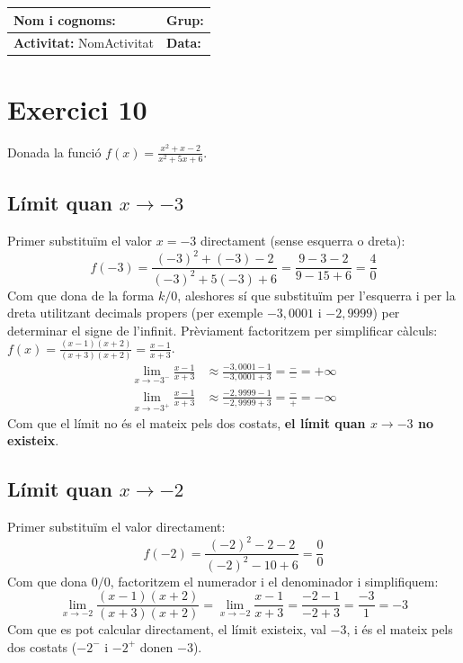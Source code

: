\documentclass[12pt,a4paper]{article}
\begin{document}
\begingroup
\renewcommand{\arraystretch}{2.2}
\begin{tabularx}{\textwidth}{|X|p{4cm}|}
    \hline
    \textbf{Nom i cognoms:} & \textbf{Grup:} \\ \hline
    \textbf{Activitat:} NomActivitat & \textbf{Data:} \\ \hline
\end{tabularx}
\endgroup

\vspace{0.8cm}

\section*{Exercici 10}
Donada la funció $f(x) = \frac{x^2+x-2}{x^2+5x+6}$.

\subsection*{Límit quan $x \to -3$}
Primer substituïm el valor $x = -3$ directament (sense esquerra o dreta):
\[ f(-3) = \frac{(-3)^2 + (-3) - 2}{(-3)^2 + 5(-3) + 6} = \frac{9 - 3 - 2}{9 - 15 + 6} = \frac{4}{0} \]
Com que dona de la forma $k/0$, aleshores sí que substituïm per l'esquerra i per la dreta utilitzant decimals propers (per exemple $-3,0001$ i $-2,9999$) per determinar el signe de l'infinit. Prèviament factoritzem per simplificar càlculs: $f(x) = \frac{(x-1)(x+2)}{(x+3)(x+2)} = \frac{x-1}{x+3}$.
\begin{align*}
    \lim_{x \to -3^-} \frac{x-1}{x+3} & \approx \frac{-3,0001 - 1}{-3,0001 + 3} = \frac{-}{-} = +\infty \\
    \lim_{x \to -3^+} \frac{x-1}{x+3} & \approx \frac{-2,9999 - 1}{-2,9999 + 3} = \frac{-}{+} = -\infty
\end{align*}
Com que el límit no és el mateix pels dos costats, \textbf{el límit quan $x \to -3$ no existeix}.

\subsection*{Límit quan $x \to -2$}
Primer substituïm el valor directament:
\[ f(-2) = \frac{(-2)^2 - 2 - 2}{(-2)^2 - 10 + 6} = \frac{0}{0} \]
Com que dona $0/0$, factoritzem el numerador i el denominador i simplifiquem:
\[ \lim_{x \to -2} \frac{(x-1)(x+2)}{(x+3)(x+2)} = \lim_{x \to -2} \frac{x-1}{x+3} = \frac{-2-1}{-2+3} = \frac{-3}{1} = -3 \]
Com que es pot calcular directament, el límit existeix, val $-3$, i és el mateix pels dos costats ($-2^-$ i $-2^+$ donen $-3$).
\end{document}
